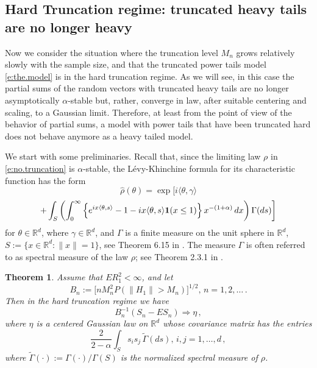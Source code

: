 \documentclass[11pt]{amsart}
\newtheorem{theorem}{Theorem}[section]
\numberwithin{equation}{section}
\begin{document}
\subsection{Hard Truncation regime: truncated heavy tails are no
  longer heavy}

Now we consider the situation where the truncation level $M_n$
grows relatively slowly with the sample size, and that the
truncated power tails model \eqref{e:the.model} is in the hard
truncation regime. As we will see, in this case the partial sums
of the random vectors with truncated heavy tails are no longer
asymptotically $\alpha$-stable but, rather, converge in law, after
suitable centering and scaling, to a Gaussian limit. Therefore, at
least from the point of view of the behavior of partial sums, a
model with power tails that have been truncated hard does not
behave anymore as a heavy tailed model.

We start with some preliminaries. Recall that, since the limiting
law $\rho$ in \eqref{e:no.truncation} is $\alpha$-stable, the
L\'evy-Khinchine formula for its characteristic function has the form
\begin{equation} \label{e:levy-khnichine}
\hat\rho(\theta)=\exp\biggl[i\langle
  \theta,\gamma\rangle
\end{equation}
$$
+\int_{S}\left( \int_0^\infty
\left\{e^{ix\langle
      \theta,s\rangle}-1-ix\langle \theta,s\rangle {{\bf 1}}(x\le
    1)\right\}x^{-(1+\alpha)}\, dx\right)\Gamma(ds)\biggr]
$$
for $\theta\in{{\mathbb R}}^d$,
where $\gamma\in{{\mathbb R}}^d$, and $\Gamma$ is a finite measure on
the unit sphere in ${{\mathbb R}}^d$,
$S:=\{x\in {\mathbb R}^d:\|x\|=1\}$, see Theorem 6.15 in
\cite{araujo:gine:1980}. The measure $\Gamma$
is often referred to as spectral measure of the law $\rho$; see
Theorem 2.3.1 in \cite{samorodnitsky:taqqu:1994}.

\begin{theorem}\label{t2} Assume that $ER_1^2<\infty$, and let
$$
B_n:=\bigl[ nM_n^2P(\|H_1\|>M_n)\bigr]^{1/2},\, n=1,2,\ldots\,.
$$
Then in the hard truncation regime we have
\begin{equation}\label{e:hard.gauss}
B_n^{-1}(S_n-ES_n)\Longrightarrow\eta\,,
\end{equation}
where $\eta$ is a centered Gaussian law on ${\mathbb R}^d$ whose
covariance matrix has the entries
\begin{equation}\label{clt.e3}
\frac{2}{2-\alpha}\int_S s_is_j\,\tilde\Gamma(ds),\, i,j =1,\ldots, d\,,
\end{equation}
where
$\tilde\Gamma(\cdot):=\Gamma(\cdot)/\Gamma(S)$ is the normalized
spectral measure of $\rho$.
\end{theorem}
\end{document}
